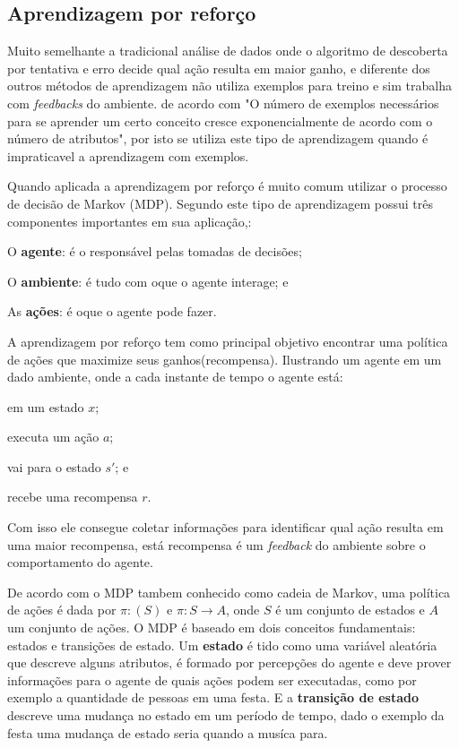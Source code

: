 \subsection{Aprendizagem por reforço}
\label{subsec:reforcing-learning}
 
Muito semelhante a tradicional análise de dados onde o algoritmo de descoberta por tentativa e erro
decide qual ação resulta em maior ganho, e diferente dos outros métodos de aprendizagem não utiliza exemplos para treino
e sim trabalha com \textit{feedbacks} do ambiente. de acordo com \cite{Valiant:1984:TL:1968.1972} "O número de exemplos necessários para 
se aprender um certo conceito cresce exponencialmente de acordo com o número de atributos", por isto se utiliza este tipo de aprendizagem
quando é impraticavel a aprendizagem com exemplos.


Quando aplicada a aprendizagem por reforço é muito comum utilizar o processo de decisão de Markov (MDP). 
Segundo \cite{mdp} este tipo de aprendizagem possui três componentes importantes em sua aplicação,:

\begin{alineas}
	\item O \textbf{agente}: é o responsável pelas tomadas de decisões;
	\item O \textbf{ambiente}: é tudo com oque o agente interage; e
	\item As \textbf{ações}: é oque o agente pode fazer.
\end{alineas}  
 
 
 A aprendizagem por reforço tem como principal objetivo encontrar uma política de ações que maximize seus ganhos(recompensa). Ilustrando 
 um agente em um dado ambiente, onde a cada instante de tempo o agente está:   

\begin{alineas}
	\item em um estado $x$;
	\item executa um ação $a$;
	\item vai para o estado $s'$; e
	\item recebe uma recompensa $r$.
\end{alineas}


Com isso ele consegue coletar informações para identificar qual ação resulta em uma maior recompensa,
está recompensa é um \textit{feedback} do ambiente sobre o comportamento do agente. 
 
De acordo com o MDP tambem conhecido como cadeia de Markov, uma política de ações é dada por $\pi: (S)$
e $\pi: S \rightarrow A $, onde $S$ é um conjunto de estados e $A$ um conjunto de ações. 
O MDP é baseado em dois conceitos fundamentais: \cite{hordijk1992} estados e transições de estado.
Um \textbf{estado} é tido como uma variável aleatória que descreve alguns atributos, é formado por percepções do agente e deve
prover informações para o agente de quais ações podem ser executadas, como por exemplo a quantidade de pessoas em uma festa.
E a \textbf{transição de estado} descreve uma mudança no estado em um período de tempo, 
dado o exemplo da festa uma mudança de estado seria quando a musíca para.

